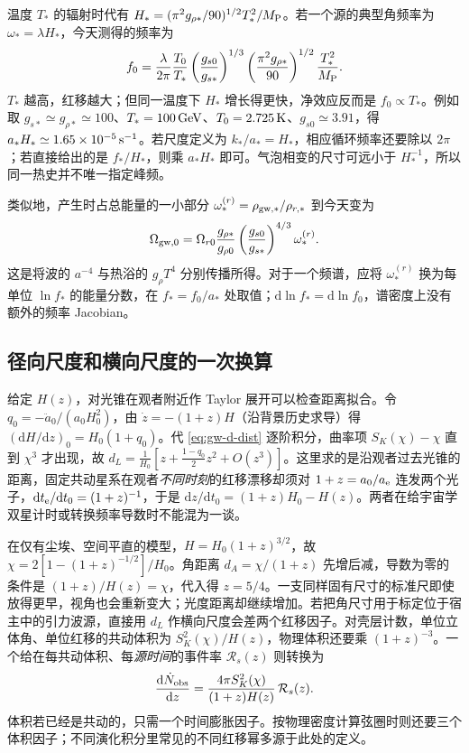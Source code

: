 温度 $T_*$ 的辐射时代有 $H_*=(\pi^2g_{\rho *}/90)^{1/2}T_*^2/M_{\rm P}$。若一个源的典型角频率为 $\omega_*=\lambda H_*$，今天测得的频率为
\begin{equation}\label{eq:gw-d-fstar}
 f_0=\frac{\lambda}{2\pi}\frac{T_0}{T_*}
       \left(\frac{g_{s0}}{g_{s*}}\right)^{1/3}
       \left(\frac{\pi^2g_{\rho *}}{90}\right)^{1/2}
       \frac{T_*^2}{M_{\rm P}} .
\end{equation}
$T_*$ 越高，红移越大；但同一温度下 $H_*$ 增长得更快，净效应反而是 $f_0\propto T_*$。例如取 $g_{s*}\simeq g_{\rho *}\simeq100$、$T_*=100\,{\rm GeV}$、$T_0=2.725\,{\rm K}$、$g_{s0}\simeq3.91$，得 $a_*H_*\simeq1.65\times10^{-5}\,{\rm s}^{-1}$。若尺度定义为 $k_*/a_*=H_*$，相应循环频率还要除以 $2\pi$；若直接给出的是 $f_*/H_*$，则乘 $a_*H_*$ 即可。气泡相变的尺寸可远小于 $H_*^{-1}$，所以同一热史并不唯一指定峰频。

类似地，产生时占总能量的一小部分 $\omega_*^{(r)}=\rho_{{\rm gw},*}/\rho_{r,*}$ 到今天变为
\begin{equation}\label{eq:gw-d-gstar}
 \Omega_{{\rm gw},0}=\Omega_{r0}
 \frac{g_{\rho *}}{g_{\rho0}}\left(\frac{g_{s0}}{g_{s*}}\right)^{4/3}
 \omega_*^{(r)} .
\end{equation}
这是将波的 $a^{-4}$ 与热浴的 $g_\rho T^4$ 分别传播所得。对于一个频谱，应将 $\omega_*^{(r)}$ 换为每单位 $\ln f_*$ 的能量分数，在 $f_*=f_0/a_*$ 处取值；$\mathrm d\ln f_*=\mathrm d\ln f_0$，谱密度上没有额外的频率 Jacobian。


\subsection{径向尺度和横向尺度的一次换算}

给定 $H(z)$，对光锥在观者附近作 Taylor 展开可以检查距离拟合。令 $q_0=-\ddot a_0/(a_0H_0^2)$，由 $\dot z=-(1+z)H$（沿背景历史求导）得 $(\mathrm dH/\mathrm dz)_0=H_0(1+q_0)$。代 \eqref{eq:gw-d-dist} 逐阶积分，曲率项 $S_K(\chi)-\chi$ 直到 $\chi^3$ 才出现，故 $d_L=\frac1{H_0}\left[z+\frac{1-q_0}{2}z^2+O(z^3)\right]$。这里求的是沿观者过去光锥的距离，固定共动星系在观者\emph{不同时刻}的红移漂移却须对 $1+z=a_0/a_{\rm e}$ 连发两个光子，$\mathrm dt_{\rm e}/\mathrm dt_0=(1+z)^{-1}$，于是 $\mathrm dz/\mathrm dt_0=(1+z)H_0-H(z)$。两者在给宇宙学双星计时或转换频率导数时不能混为一谈。

在仅有尘埃、空间平直的模型，$H=H_0(1+z)^{3/2}$，故 $\chi=2[1-(1+z)^{-1/2}]/H_0$。角距离 $d_A=\chi/(1+z)$ 先增后减，导数为零的条件是 $(1+z)/H(z)=\chi$，代入得 $z=5/4$。一支同样固有尺寸的标准尺即使放得更早，视角也会重新变大；光度距离却继续增加。若把角尺寸用于标定位于宿主中的引力波源，直接用 $d_L$ 作横向尺度会差两个红移因子。对壳层计数，单位立体角、单位红移的共动体积为 $S_K^2(\chi)/H(z)$，物理体积还要乘 $(1+z)^{-3}$。一个给在每共动体积、每\emph{源时间}的事件率 $\mathcal R_s(z)$ 则转换为
\[
 \frac{\mathrm d\dot N_{\rm obs}}{\mathrm dz}
 =\frac{4\pi S_K^2(\chi)}{(1+z)H(z)}\,\mathcal R_s(z).
\]
体积若已经是共动的，只需一个时间膨胀因子。按物理密度计算弦圈时则还要三个体积因子；不同演化积分里常见的不同红移幂多源于此处的定义。

